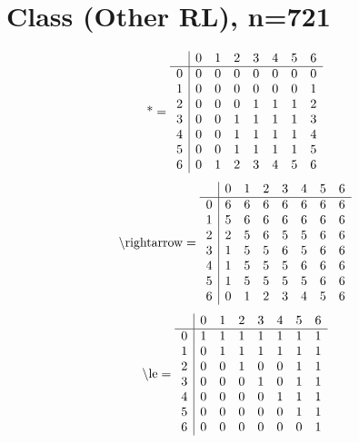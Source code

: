 \documentclass[11pt]{article}
\begin{document}
\section{Class (Other RL), n=721}
\[\text{*} = 
\begin{array}{r | r r r r r r r}
 & 0 & 1 & 2 & 3 & 4 & 5 & 6 \\ \hline
0 & 0 & 0 & 0 & 0 & 0 & 0 & 0 \\
1 & 0 & 0 & 0 & 0 & 0 & 0 & 1 \\
2 & 0 & 0 & 0 & 1 & 1 & 1 & 2 \\
3 & 0 & 0 & 1 & 1 & 1 & 1 & 3 \\
4 & 0 & 0 & 1 & 1 & 1 & 1 & 4 \\
5 & 0 & 0 & 1 & 1 & 1 & 1 & 5 \\
6 & 0 & 1 & 2 & 3 & 4 & 5 & 6 \\
\end{array}
\]
\[\text{\textbackslash rightarrow} = 
\begin{array}{r | r r r r r r r}
 & 0 & 1 & 2 & 3 & 4 & 5 & 6 \\ \hline
0 & 6 & 6 & 6 & 6 & 6 & 6 & 6 \\
1 & 5 & 6 & 6 & 6 & 6 & 6 & 6 \\
2 & 2 & 5 & 6 & 5 & 5 & 6 & 6 \\
3 & 1 & 5 & 5 & 6 & 5 & 6 & 6 \\
4 & 1 & 5 & 5 & 5 & 6 & 6 & 6 \\
5 & 1 & 5 & 5 & 5 & 5 & 6 & 6 \\
6 & 0 & 1 & 2 & 3 & 4 & 5 & 6 \\
\end{array}
\]
\[\text{\textbackslash le} = 
\begin{array}{r | r r r r r r r}
 & 0 & 1 & 2 & 3 & 4 & 5 & 6 \\ \hline
0 & 1 & 1 & 1 & 1 & 1 & 1 & 1 \\
1 & 0 & 1 & 1 & 1 & 1 & 1 & 1 \\
2 & 0 & 0 & 1 & 0 & 0 & 1 & 1 \\
3 & 0 & 0 & 0 & 1 & 0 & 1 & 1 \\
4 & 0 & 0 & 0 & 0 & 1 & 1 & 1 \\
5 & 0 & 0 & 0 & 0 & 0 & 1 & 1 \\
6 & 0 & 0 & 0 & 0 & 0 & 0 & 1 \\
\end{array}
\]
\end{document}
